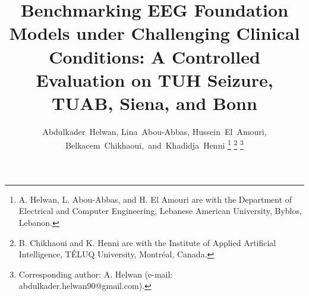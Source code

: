 \documentclass[journal]{IEEEtran}
\begin{document}
\title{Benchmarking EEG Foundation Models under Challenging Clinical Conditions: A Controlled Evaluation on TUH Seizure, TUAB, Siena, and Bonn}

\author{Abdulkader~Helwan, Lina~Abou-Abbas, Hussein~El~Amouri, Belkacem~Chikhaoui,~and~Khadidja~Henni
\thanks{A. Helwan, L. Abou-Abbas, and H. El Amouri are with the Department of Electrical and Computer Engineering, Lebanese American University, Byblos, Lebanon.}
\thanks{B. Chikhaoui and K. Henni are with the Institute of Applied Artificial Intelligence, TÉLUQ University, Montréal, Canada.}
\thanks{Corresponding author: A. Helwan (e-mail: abdulkader.helwan90@gmail.com).}}


\maketitle
\end{document}
